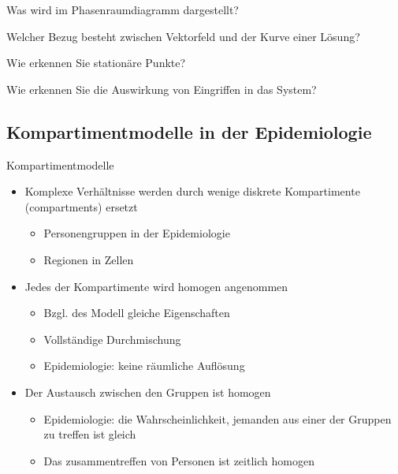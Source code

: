 \begin{Abschluss}
\item Was wird im Phasenraumdiagramm dargestellt?
\item Welcher Bezug besteht zwischen Vektorfeld und der Kurve einer Lösung?
\item Wie erkennen Sie stationäre Punkte?
\item Wie erkennen Sie die Auswirkung von Eingriffen in das System?
\end{Abschluss}

\subsection{Kompartimentmodelle in der Epidemiologie}

\begin{frame}{Kompartimentmodelle}
  \begin{itemize}
  \item Komplexe Verhältnisse werden durch wenige diskrete \glqq{}Kompartimente\grqq{} (compartments) ersetzt
    \begin{itemize}
    \item Personengruppen in der Epidemiologie
    \item Regionen in Zellen
    \end{itemize}
  \item Jedes der Kompartimente wird homogen angenommen
    \begin{itemize}
    \item Bzgl. des Modell gleiche Eigenschaften
    \item Vollständige Durchmischung
    \item Epidemiologie: keine räumliche Auflösung
    \end{itemize}
  \item Der Austausch zwischen den Gruppen ist homogen
    \begin{itemize}
    \item Epidemiologie: die Wahrscheinlichkeit, jemanden aus einer
      der Gruppen zu treffen ist gleich
    \item Das zusammentreffen von Personen ist zeitlich homogen
    \end{itemize}
  \end{itemize}
\end{frame}

